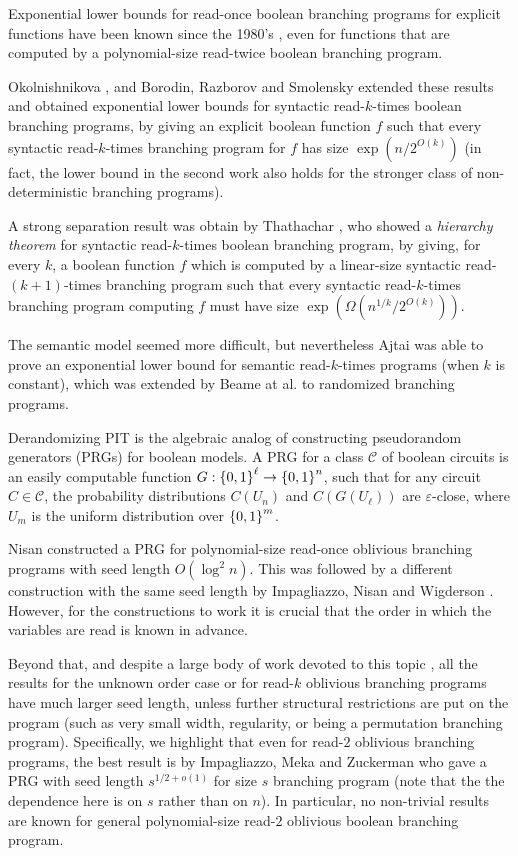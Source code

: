 \documentclass[11pt]{article}
\def\epsilon{\varepsilon} %
\begin{document}
Exponential lower bounds for read-once boolean branching programs for explicit functions have been known since the 1980's \cite{Zak84, BHST87, Wegener88}, even for functions that are computed by a polynomial-size read-twice boolean branching program.

Okolnishnikova \cite{Oko91}, and Borodin, Razborov and Smolensky \cite{BRS93} extended these results and obtained exponential lower bounds for syntactic read-$k$-times boolean branching programs, by giving an explicit boolean function $f$ such that every syntactic read-$k$-times branching program for $f$ has size $\exp(n/2^{O(k)})$ (in fact, the lower bound in the second work also holds for the stronger class of non-deterministic branching programs).

A strong separation result was obtain by Thathachar \cite{Thathachar98}, who showed a {\em hierarchy theorem} for syntactic read-$k$-times boolean branching program, by giving, for every $k$, a boolean function $f$ which is computed by a linear-size syntactic read-$(k+1)$-times branching program such that every syntactic read-$k$-times branching program computing $f$ must have size $\exp(\Omega(n^{1/k}/2^{O(k)}))$.

The semantic model seemed more difficult, but nevertheless Ajtai \cite{Ajtai05} was able to prove an exponential lower bound for semantic read-$k$-times programs (when $k$ is constant), which was extended by Beame at al.
\cite{BSSV03} to randomized branching programs.

\medskip

Derandomizing PIT is the algebraic analog of constructing pseudorandom generators (PRGs) for boolean models.
A PRG for a class $\mathcal{C}$ of boolean circuits is an easily computable function $G : \left\{ 0,1 \right\}^{\ell} \to \left\{ 0,1 \right\}^n$, such that for any circuit $C \in \mathcal{C}$, the probability distributions $C(U_n)$ and $C(G(U_{\ell}))$ are $\epsilon$-close, where $U_m$ is the uniform distribution over $\left\{ 0,1 \right\}^m$.

Nisan \cite{Nisan92} constructed a PRG for polynomial-size read-once oblivious branching programs with seed length $O(\log^2 n)$.
This was followed by a different construction with the same seed length by Impagliazzo, Nisan and Wigderson \cite{INW94}.
However, for the constructions to work it is crucial that the order in which the variables are read is known in advance.

Beyond that, and despite a large body of work devoted to this topic \cite{BDVY13, BPW11, BRRY14, De11, GMRTV12, IMZ12, KNP11, RSV13, Steinke12, SVW14}, all the results for the unknown order case or for read-$k$ oblivious branching programs have much larger seed length, unless further structural restrictions are put on the program (such as very small width, regularity, or being a permutation branching program).
Specifically, we highlight that even for read-$2$ oblivious branching programs, the best result is by Impagliazzo, Meka and Zuckerman \cite{IMZ12} who gave a PRG with seed length $s^{1/2 + o(1)}$ for size $s$ branching program (note that the the dependence here is on $s$ rather than on $n$).
In particular, no non-trivial results are known for general polynomial-size read-$2$ oblivious boolean branching program.
\end{document}

